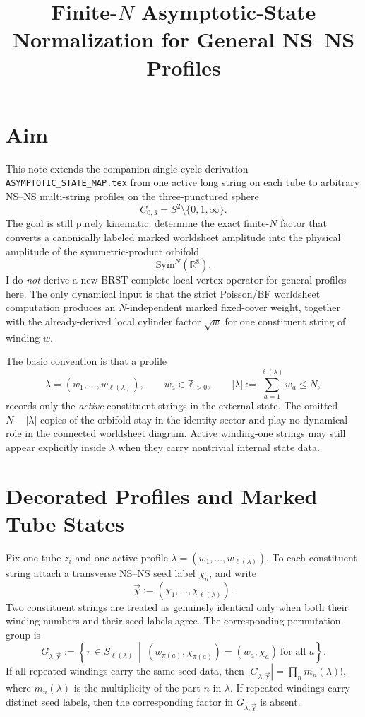 \documentclass[11pt]{article}
\title{Finite-\texorpdfstring{$N$}{N} Asymptotic-State Normalization for General NS--NS Profiles}
\author{}
\date{}
\newcommand{\Sym}{\mathrm{Sym}}
\newcommand{\bR}{\mathbb{R}}
\begin{document}
\maketitle

\section{Aim}
This note extends the companion single-cycle derivation \texttt{ASYMPTOTIC\_STATE\_MAP.tex} from one active long string on each tube to arbitrary NS--NS multi-string profiles on the three-punctured sphere
\[
C_{0,3}=S^2\setminus\{0,1,\infty\}.
\]
The goal is still purely kinematic: determine the exact finite-$N$ factor that converts a canonically labeled marked worldsheet amplitude into the physical amplitude of the symmetric-product orbifold
\begin{equation}\label{eq:aim-orbifold-general}
\Sym^N(\bR^8).
\end{equation}
I do \emph{not} derive a new BRST-complete local vertex operator for general profiles here. The only dynamical input is that the strict Poisson/BF worldsheet computation produces an $N$-independent marked fixed-cover weight, together with the already-derived local cylinder factor $\sqrt{w}$ for one constituent string of winding $w$.

The basic convention is that a profile
\begin{equation}\label{eq:active-profile}
\lambda=(w_1,\dots,w_{\ell(\lambda)}),
\qquad
w_a\in \mathbb{Z}_{>0},
\qquad
|\lambda|:=\sum_{a=1}^{\ell(\lambda)} w_a\le N,
\end{equation}
records only the \emph{active} constituent strings in the external state. The omitted $N-|\lambda|$ copies of the orbifold stay in the identity sector and play no dynamical role in the connected worldsheet diagram. Active winding-one strings may still appear explicitly inside $\lambda$ when they carry nontrivial internal state data.

\section{Decorated Profiles and Marked Tube States}
Fix one tube $z_i$ and one active profile $\lambda=(w_1,\dots,w_{\ell(\lambda)})$. To each constituent string attach a transverse NS--NS seed label $\chi_a$, and write
\begin{equation}\label{eq:decorated-profile-data}
\vec\chi:=(\chi_1,\dots,\chi_{\ell(\lambda)}).
\end{equation}
Two constituent strings are treated as genuinely identical only when both their winding numbers and their seed labels agree. The corresponding permutation group is
\begin{equation}\label{eq:identical-constituent-group}
G_{\lambda,\vec\chi}
:=
\left\{
\pi\in S_{\ell(\lambda)}
\ \middle|\
(w_{\pi(a)},\chi_{\pi(a)})=(w_a,\chi_a)\ \text{for all }a
\right\}.
\end{equation}
If all repeated windings carry the same seed data, then $|G_{\lambda,\vec\chi}|=\prod_n m_n(\lambda)!$, where $m_n(\lambda)$ is the multiplicity of the part $n$ in $\lambda$. If repeated windings carry distinct seed labels, then the corresponding factor in $G_{\lambda,\vec\chi}$ is absent.
\end{document}
